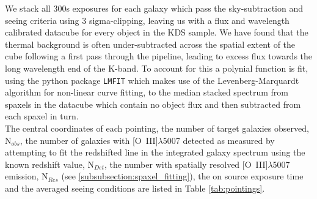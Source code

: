 \documentclass[fleqn,usenatbib]{mn2e}
\begin{document}
We stack all 300s exposures for each galaxy which pass the sky-subtraction and seeing criteria using 3 sigma-clipping, leaving us with a flux and wavelength calibrated datacube for every object in the KDS sample.
We have found that the thermal background is often under-subtracted across the spatial extent of the cube following a first pass through the pipeline, leading to excess flux towards the long wavelength end of the K-band.
To account for this a polynial function is fit, using the python package {\tt LMFIT} \citep{Newville2014} which makes use of the Levenberg-Marquardt algorithm for non-linear curve fitting, to the median stacked spectrum from spaxels in the datacube which contain no object flux and then subtracted from each spaxel in turn. \\

The central coordinates of each pointing, the number of target galaxies observed, N$_{obs}$, the number of galaxies with [O~{\sc III}]$\lambda$5007 detected as measured by attempting to fit the redshifted line in the integrated galaxy spectrum using the known redshift value, N$_{Det}$, the number with spatially resolved [O~{\sc III}]$\lambda$5007 emission, N$_{Res}$ (see \cref{subsubsection:spaxel_fitting}), the on source exposure time and the averaged seeing conditions are listed in Table \ref{tab:pointings}.
\end{document}
